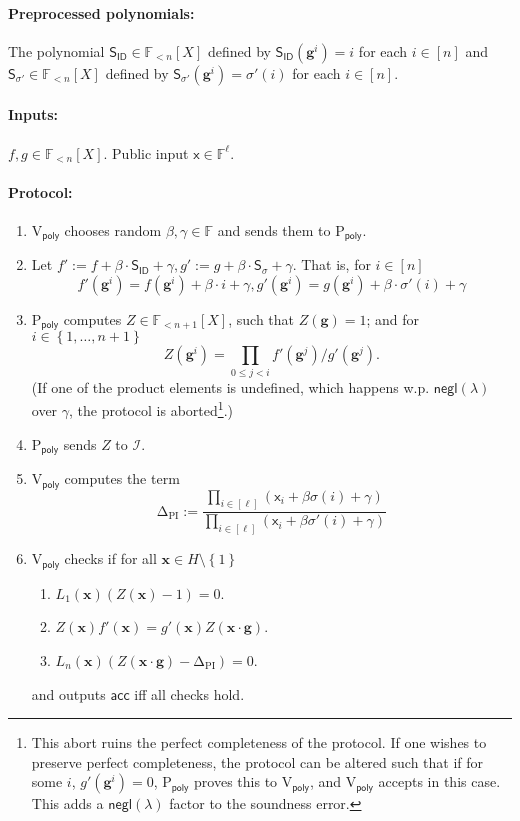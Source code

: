 \documentclass[11pt]{article} %
\newcommand{\x}{\ensuremath{\mathbf{x}}\xspace}
\newcommand{\F}{\ensuremath{\mathbb F}\xspace}
\newcommand{\pubinputdelta}{\ensuremath{\mathrm{\Delta_{\mathrm{PI}}}}\xspace}
\newcommand{\negl}{\ensuremath{\mathsf{negl}(\lambda)}\xspace}
\newcommand{\acc}{\ensuremath{\mathsf{acc}}\xspace}
\newcommand{\defeq}{:=}
\newcommand{\dom}{\ensuremath{H\setminus\set{1}}\xspace}
\newcommand{\prvpoly}{\ensuremath{\mathrm{P_{\mathsf{poly}}}}\xspace}
\newcommand{\verpoly}{\ensuremath{\mathrm{V_{\mathsf{poly}}}}\xspace}
\newcommand{\ideal}{\ensuremath{\mathcal{I}}\xspace}
\newcommand{\inp}{\ensuremath{\mathsf{x}}\xspace}
\newcommand{\set}[1]{\ensuremath{\left\{#1\right\}}\xspace}
\newcommand{\hgen}{\ensuremath{\mathbf{g}}\xspace}
\newcommand{\polysofdeg}[1]{\ensuremath{\F_{< #1}[X]}\xspace}
\newcommand{\sig}{\ensuremath{\sigma}\xspace}
\newcommand{\sigpoly}{\ensuremath{\mathsf{S_{\sigma}}}\xspace}
\newcommand{\sigprimepoly}{\ensuremath{\mathsf{S_{\sigma'}}}\xspace}
\newcommand{\idpoly}{\ensuremath{\mathsf{S_{ID}}}\xspace}
\begin{document}
\paragraph{Preprocessed polynomials:}
The polynomial $\idpoly\in \polysofdeg{n}$ defined by 
$\idpoly(\hgen^{i}) = i$ for each $i\in [n]$ and $\sigprimepoly \in \polysofdeg{n}$ defined by
$\sigprimepoly(\hgen^{i}) = \sig'(i)$ for each $i\in [n]$.
\paragraph{Inputs:}
$f,g\in \polysofdeg{n}$. Public input $\inp\in \F^\ell$.
\paragraph{Protocol:}
\begin{enumerate}
 \item\label{item:betgamma} \verpoly chooses random $\beta,\gamma \in\F$ and sends them to \prvpoly.
 \item Let $f'\defeq f+\beta\cdot  \idpoly +\gamma, g'\defeq g+\beta\cdot \sigpoly + \gamma$.
That is, for $i\in [n]$
 \[f'(\hgen^i) = f(\hgen^i) + \beta\cdot i + \gamma,
 g'(\hgen^i) = g(\hgen^i) + \beta\cdot \sigma'(i) + \gamma\]
 \item \prvpoly computes $Z \in \polysofdeg{n+1}$, such that 
 $Z(\hgen) = 1$; and for $i\in \set{1,\ldots,n+1}$
 \[Z(\hgen^i)  = \prod_{0\leq j <i} f'(\hgen^j)/g'(\hgen^j).\]
 (If one of the product elements is undefined, which happens w.p. \negl over $\gamma$, the protocol is aborted\footnote{This abort ruins the perfect completeness of the protocol. If one wishes to preserve perfect completeness, the protocol can be altered such that if for some $i$, $g'(\hgen^i)=0$, \prvpoly proves this to \verpoly, and \verpoly accepts in this case. This adds a \negl factor to the soundness error.}.)
 \item \prvpoly sends $Z$ to \ideal.
 \item \verpoly computes the term 
 \[\pubinputdelta\defeq \frac{\prod_{i\in [\ell]}(\inp_i +\beta\sigma(i) + \gamma)} {\prod_{i\in [\ell]} (\inp_i + \beta \sigma'(i) + \gamma)}\]
 \item \verpoly checks if for all $\x\in \dom$
 \begin{enumerate}
  \item $L_1(\x) (Z(\x)-1) = 0$.
  \item $Z(\x)f'(\x) = g'(\x)Z(\x\cdot \hgen)$.
\item $L_n(\x)(Z(\x\cdot \hgen)-\pubinputdelta) = 0$.
  \end{enumerate}
and outputs \acc iff all checks hold.
\end{enumerate}
\end{document}
